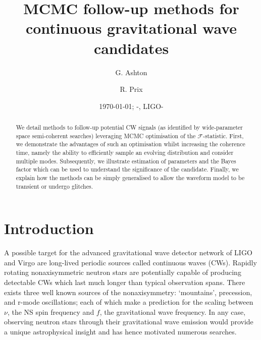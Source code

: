 \documentclass[aps, prd, twocolumn, superscriptaddress, floatfix, showpacs, nofootinbib, longbibliography]{revtex4-1}
\newcommand{\dcc}{LIGO-{\color{red}}}
\begin{document}
\title{MCMC follow-up methods for continuous gravitational wave candidates}

    \author{G. Ashton}
    \author{R. Prix}

\date{\today}

\begin{abstract}
We detail methods to follow-up potential CW signals (as identified by
wide-parameter space semi-coherent searches) leveraging MCMC optimisation of the
$\mathcal{F}$-statistic. First, we demonstrate the advantages of such an
optimisation whilst increasing the coherence time, namely the ability to
efficiently sample an evolving distribution and consider multiple modes.
Subsequently, we illustrate estimation of parameters and the Bayes factor which
can be used to understand the significance of the candidate. Finally, we explain
how the methods can be simply generalised to allow the waveform model to be
transient or undergo glitches.

\end{abstract}


\date{\commitDATE; \commitIDshort-\commitSTATUS, \dcc}

\maketitle


\section{Introduction}

A possible target for the advanced gravitational wave detector network of LIGO
and Virgo are long-lived periodic sources called continuous waves (CWs).
Rapidly rotating nonaxisymmetric neutron stars are potentially capable of
producing detectable CWs which last much longer than typical observation spans.
There exists three well known sources of the nonaxisymmetry: `mountains',
precession, and r-mode oscillations; each of which make a prediction for the
scaling between $\nu$, the NS spin frequency and $f$, the gravitational wave
frequency. In any case, observing neutron stars through their gravitational
wave emission would provide a unique astrophysical insight and has hence
motivated numerous searches.
\end{document}
